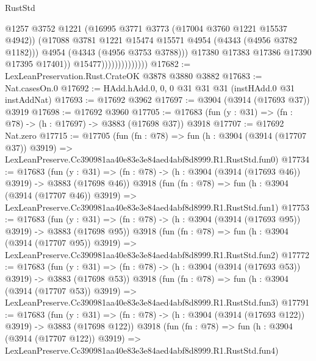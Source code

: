 \begin{lexlean}{RustStd}
\begin{coremodule}
                                      @1257
                                      @3752
                                      @1221
                                      (@16995 @3771 @3773 (@17004 @3760 @1221 @15537 @4942))
                                      (@17088
                                        @3781
                                        @1221
                                        @15474
                                        @15571
                                        @4954
                                        (@4343 (@4956 @3782 @1182)))
                                      @4954
                                      (@4343 (@4956 @3753 @3788)))
                                    @17380
                                    @17383
                                    @17386
                                    @17390
                                    @17395
                                    @17401))
                                @15477))))))))))))))
@17682 := LexLeanPreservation.Rust.CrateOK @3878 @3880 @3882
@17683 := Nat.casesOn.{0}
@17692 := HAdd.hAdd.{0, 0, 0} @31 @31 @31 (instHAdd.{0} @31 instAddNat)
@17693 := @17692 @3962
@17697 := @3904 (@3914 (@17693 @37)) @3919
@17698 := @17692 @3960
@17705 := @17683 (fun (y : @31) => (fn : @78) -> (h : @17697) -> @3883 (@17698 @37)) @3918
@17707 := @17692 Nat.zero
@17715 := @17705
    (fun (fn : @78) =>
    fun (h : @3904 (@3914 (@17707 @37)) @3919) =>
    LexLeanPreserve.Cc390981aa40e83e3e84aed4abf8d8999.R1.RustStd.fun0)
@17734 := @17683
    (fun (y : @31) => (fn : @78) -> (h : @3904 (@3914 (@17693 @46)) @3919) -> @3883 (@17698 @46))
    @3918
    (fun (fn : @78) =>
    fun (h : @3904 (@3914 (@17707 @46)) @3919) =>
    LexLeanPreserve.Cc390981aa40e83e3e84aed4abf8d8999.R1.RustStd.fun1)
@17753 := @17683
    (fun (y : @31) => (fn : @78) -> (h : @3904 (@3914 (@17693 @95)) @3919) -> @3883 (@17698 @95))
    @3918
    (fun (fn : @78) =>
    fun (h : @3904 (@3914 (@17707 @95)) @3919) =>
    LexLeanPreserve.Cc390981aa40e83e3e84aed4abf8d8999.R1.RustStd.fun2)
@17772 := @17683
    (fun (y : @31) => (fn : @78) -> (h : @3904 (@3914 (@17693 @53)) @3919) -> @3883 (@17698 @53))
    @3918
    (fun (fn : @78) =>
    fun (h : @3904 (@3914 (@17707 @53)) @3919) =>
    LexLeanPreserve.Cc390981aa40e83e3e84aed4abf8d8999.R1.RustStd.fun3)
@17791 := @17683
    (fun (y : @31) => (fn : @78) -> (h : @3904 (@3914 (@17693 @122)) @3919) -> @3883 (@17698 @122))
    @3918
    (fun (fn : @78) =>
    fun (h : @3904 (@3914 (@17707 @122)) @3919) =>
    LexLeanPreserve.Cc390981aa40e83e3e84aed4abf8d8999.R1.RustStd.fun4)

\end{coremodule}
\end{lexlean}
